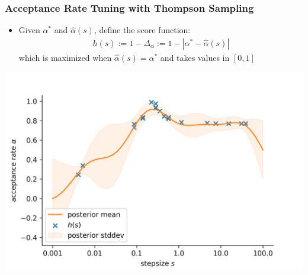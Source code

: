 \begin{frame}[c]
    \frametitle{Acceptance Rate Tuning with Thompson Sampling}
    \begin{itemize}
        \item Given $\alpha^*$ and $\hat{\alpha}(s)$, define the score function:
            \begin{align*}
                h(s) := 1 - \Delta_\alpha := 1 - | \alpha^* - \hat{\alpha}(s)|
            \end{align*}
            which is maximized when $\hat{\alpha}(s) = \alpha^*$ and takes values in $[0,1]$
    \end{itemize}
    \vspace{-0.8cm}
    \begin{center}
        \includegraphics[scale=0.5]{imgs/accratethompsonsampling.png}
    \end{center}
    \vspace{-0.5cm}
\end{frame}

